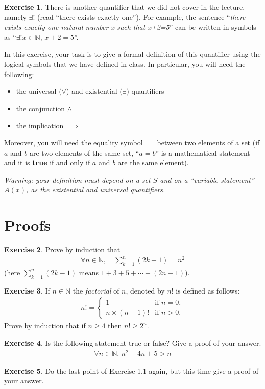 \documentclass[a4paper,oneside]{article}
\theoremstyle{definition} \newtheorem{exercise}{Exercise}[section]
\begin{document}
\begin{exercise}
  There is another quantifier that we did not cover in the lecture, namely
  $\exists!$ (read ``there exists exactly one''). For example, the sentence
  ``\emph{there exists exactly one natural number x such that x+2=5}'' can be
  written in symbols as ``$\exists!x\in \mathbb N,\,x+2=5$''.

  In this exercise, your task is to give a formal definition of this quantifier
  using the logical symbols that we have defined in class. In particular, you
  will need the following:
  \begin{itemize}
    \item the universal ($\forall$) and existential ($\exists$) quantifiers
    \item the conjunction $\land$
    \item the implication $\implies$
  \end{itemize}
  Moreover, you will need the equality symbol $=$ between two elements of a set
  (if $a$ and $b$ are two elements of the same set, ``$a=b$'' is a mathematical
  statement and it is \textbf{true} if and only if $a$ and $b$ are the same
  element).
  
  \emph{Warning: your definition must depend on a set $S$ and on a ``variable
  statement'' $A(x)$, as the existential and universal quantifiers.}
\end{exercise}

\section{Proofs}

\begin{exercise}
  Prove by induction that
  \begin{align*}
    \forall n\in\mathbb N,\quad \sum_{k=1}^n(2k-1)=n^2
  \end{align*}
    (here $\sum_{k=1}^n(2k-1)$ means $1+3+5+\cdots+ (2n-1)$).
\end{exercise}

\begin{exercise}
  If $n\in \mathbb N$ the \emph{factorial} of $n$, denoted by $n!$ is defined
  as follows:
  \begin{align*}
    n!=\begin{cases}
      1&\text{if } n=0,\\
      n\times (n-1)! & \text{if } n> 0.
    \end{cases}
  \end{align*}
  Prove by induction that if $n\geq 4$ then $n!\geq 2^n$.
\end{exercise}


\begin{exercise}
  Is the following statement true or false? Give a proof of your answer.
  \begin{align*}
    \forall n\in \mathbb N,\, n^2 -4n +5>n
  \end{align*}
\end{exercise}

\begin{exercise}
  Do the last point of Exercise 1.1 again, but this time give a proof of your
  answer.
\end{exercise}
\end{document}
